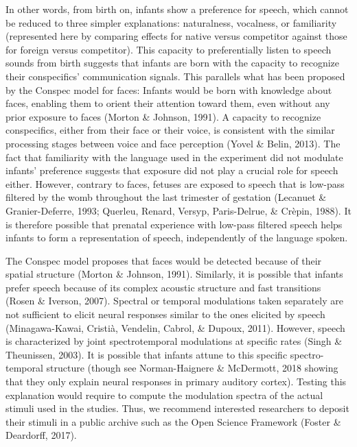 \documentclass[man]{apa6}
\begin{document}
In other words, from birth on, infants show a preference for speech, which cannot be reduced to three simpler explanations: naturalness, vocalness, or familiarity (represented here by comparing effects for native versus competitor against those for foreign versus competitor). This capacity to preferentially listen to speech sounds from birth suggests that infants are born with the capacity to recognize their conspecifics' communication signals. This parallels what has been proposed by the Conspec model for faces: Infants would be born with knowledge about faces, enabling them to orient their attention toward them, even without any prior exposure to faces (Morton \& Johnson, 1991). A capacity to recognize conspecifics, either from their face or their voice, is consistent with the similar processing stages between voice and face perception (Yovel \& Belin, 2013).
The fact that familiarity with the language used in the experiment did not modulate infants' preference suggests that exposure did not play a crucial role for speech either. However, contrary to faces, fetuses are exposed to speech that is low-pass filtered by the womb throughout the last trimester of gestation (Lecanuet \& Granier-Deferre, 1993; Querleu, Renard, Versyp, Paris-Delrue, \& Crèpin, 1988). It is therefore possible that prenatal experience with low-pass filtered speech helps infants to form a representation of speech, independently of the language spoken.

The Conspec model proposes that faces would be detected because of their spatial structure (Morton \& Johnson, 1991). Similarly, it is possible that infants prefer speech because of its complex acoustic structure and fast transitions (Rosen \& Iverson, 2007). Spectral or temporal modulations taken separately are not sufficient to elicit neural responses similar to the ones elicited by speech (Minagawa-Kawai, Cristià, Vendelin, Cabrol, \& Dupoux, 2011). However, speech is characterized by joint spectrotemporal modulations at specific rates (Singh \& Theunissen, 2003). It is possible that infants attune to this specific spectro-temporal structure (though see Norman-Haignere \& McDermott, 2018 showing that they only explain neural responses in primary auditory cortex). Testing this explanation would require to compute the modulation spectra of the actual stimuli used in the studies. Thus, we recommend interested researchers to deposit their stimuli in a public archive such as the Open Science Framework (Foster \& Deardorff, 2017).
\end{document}

